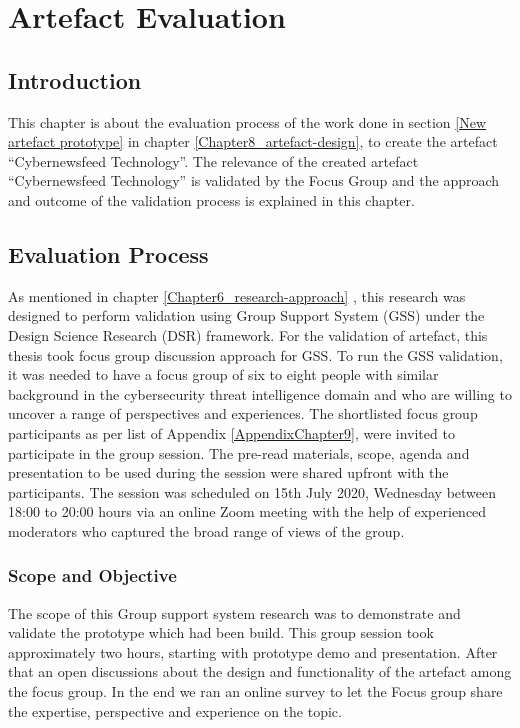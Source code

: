 
\chapter{Artefact Evaluation} %

\label{Chapter9_artefact-evaluation} %

\section{Introduction }
This chapter is about the evaluation process of the work done in section \ref{New artefact prototype} in  chapter \ref{Chapter8_artefact-design},   to create the artefact \enquote{Cybernewsfeed Technology}. The relevance of the created artefact \enquote{Cybernewsfeed Technology} is validated by the Focus Group and the approach and outcome of the validation process is explained in this chapter.

\section{Evaluation Process}
As mentioned in chapter \ref{Chapter6_research-approach} , this research was designed to perform validation using Group Support System (GSS) under the Design Science Research (DSR) framework. 
For the validation of artefact, this thesis took focus group
\citep{langford2012qualitative} discussion approach for GSS. 
To run the GSS validation,
it was needed to have a focus group
\citep{langford2012qualitative} 
of six to eight people with similar background in the cybersecurity threat intelligence domain and who are willing to uncover a range of perspectives and experiences. 
The shortlisted  focus group participants as per list of Appendix \ref{AppendixChapter9}, 
 were invited to participate in the group session. 
The pre-read materials, scope, agenda and presentation to be used during the session were shared upfront with the participants. 
The session was scheduled on 15th July 2020, 
Wednesday between 18:00 to 20:00 hours via an online Zoom meeting with the help of experienced moderators who captured the broad range of views of the group.


\subsection{Scope and Objective}
The scope of this Group support system research was to demonstrate and validate the prototype which had been build. 
This group session took approximately two hours, 
starting with prototype demo and  presentation.
 After that an open discussions about the design and functionality of the artefact among the focus group. 
In the end we ran an online survey to let the Focus group share the expertise, 
perspective and experience on the topic.

